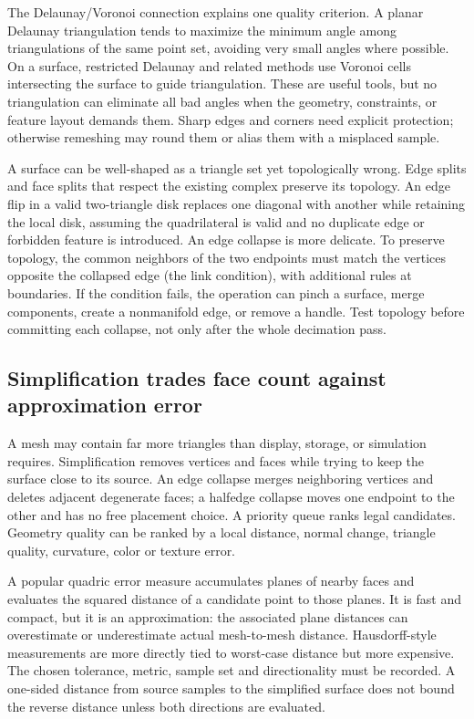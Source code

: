 The Delaunay/Voronoi connection explains one quality criterion. A planar Delaunay triangulation tends to maximize the minimum angle among triangulations of the same point set, avoiding very small angles where possible. On a surface, restricted Delaunay and related methods use Voronoi cells intersecting the surface to guide triangulation. These are useful tools, but no triangulation can eliminate all bad angles when the geometry, constraints, or feature layout demands them. Sharp edges and corners need explicit protection; otherwise remeshing may round them or alias them with a misplaced sample.

A surface can be well-shaped as a triangle set yet topologically wrong. Edge splits and face splits that respect the existing complex preserve its topology. An edge flip in a valid two-triangle disk replaces one diagonal with another while retaining the local disk, assuming the quadrilateral is valid and no duplicate edge or forbidden feature is introduced. An edge collapse is more delicate. To preserve topology, the common neighbors of the two endpoints must match the vertices opposite the collapsed edge (the link condition), with additional rules at boundaries. If the condition fails, the operation can pinch a surface, merge components, create a nonmanifold edge, or remove a handle. Test topology before committing each collapse, not only after the whole decimation pass.

\subsection{Simplification trades face count against approximation error}\label{03-visual-computing-i-ch002-simplification-trades-face-count-against-approximation-error}

A mesh may contain far more triangles than display, storage, or simulation requires. Simplification removes vertices and faces while trying to keep the surface close to its source. An edge collapse merges neighboring vertices and deletes adjacent degenerate faces; a halfedge collapse moves one endpoint to the other and has no free placement choice. A priority queue ranks legal candidates. Geometry quality can be ranked by a local distance, normal change, triangle quality, curvature, color or texture error.

A popular quadric error measure accumulates planes of nearby faces and evaluates the squared distance of a candidate point to those planes. It is fast and compact, but it is an approximation: the associated plane distances can overestimate or underestimate actual mesh-to-mesh distance. Hausdorff-style measurements are more directly tied to worst-case distance but more expensive. The chosen tolerance, metric, sample set and directionality must be recorded. A one-sided distance from source samples to the simplified surface does not bound the reverse distance unless both directions are evaluated.

